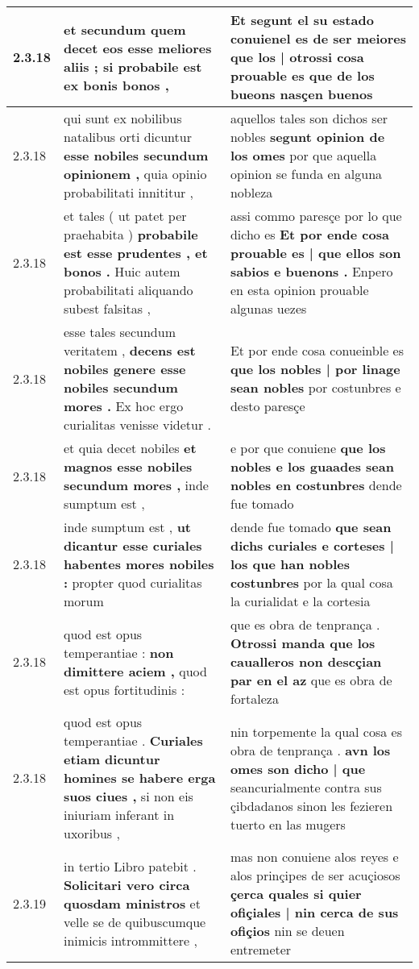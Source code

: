 \begin{tabular}{|p{1cm}|p{6.5cm}|p{6.5cm}|}
2.3.18 & et secundum quem decet \textbf{ eos esse meliores aliis ; } si probabile est ex bonis bonos , & Et segunt el su estado conuienel es de ser meiores \textbf{ que los | otrossi cosa prouable es } que de los bueons nasçen buenos \\\hline
2.3.18 & qui sunt ex nobilibus natalibus orti dicuntur \textbf{ esse nobiles secundum opinionem , } quia opinio probabilitati innititur , & aquellos tales son dichos ser nobles \textbf{ segunt opinion de los omes } por que aquella opinion se funda en alguna nobleza \\\hline
2.3.18 & et tales ( ut patet per praehabita ) \textbf{ probabile est esse prudentes , et bonos . } Huic autem probabilitati aliquando subest falsitas , & assi commo paresçe por lo que dicho es \textbf{ Et por ende cosa prouable es | que ellos son sabios e buenons . } Enpero en esta opinion prouable algunas uezes \\\hline
2.3.18 & esse tales secundum veritatem , \textbf{ decens est nobiles genere esse nobiles secundum mores . } Ex hoc ergo curialitas venisse videtur . & Et por ende cosa conueinble es \textbf{ que los nobles | por linage sean nobles } por costunbres e desto paresçe \\\hline
2.3.18 & et quia decet nobiles \textbf{ et magnos esse nobiles secundum mores , } inde sumptum est , & e por que conuiene \textbf{ que los nobles e los guaades sean nobles en costunbres } dende fue tomado \\\hline
2.3.18 & inde sumptum est , \textbf{ ut dicantur esse curiales habentes mores nobiles : } propter quod curialitas morum & dende fue tomado \textbf{ que sean dichs curiales e corteses | los que han nobles costunbres } por la qual cosa la curialidat e la cortesia \\\hline
2.3.18 & quod est opus temperantiae : \textbf{ non dimittere aciem , } quod est opus fortitudinis : & que es obra de tenprança . \textbf{ Otrossi manda que los caualleros non descçian par en el az } que es obra de fortaleza \\\hline
2.3.18 & quod est opus temperantiae . \textbf{ Curiales etiam dicuntur homines se habere erga suos ciues , } si non eis iniuriam inferant in uxoribus , & nin torpemente la qual cosa es obra de tenprança . \textbf{ avn los omes son dicho | que } seancurialmente contra sus çibdadanos sinon les fezieren tuerto en las mugers \\\hline
2.3.19 & in tertio Libro patebit . \textbf{ Solicitari vero circa quosdam ministros } et velle se de quibuscumque inimicis intrommittere , & mas non conuiene alos reyes e alos prinçipes de ser acuçiosos \textbf{ çerca quales si quier ofiçiales | nin cerca de sus ofiçios } nin se deuen entremeter \\\hline

\end{tabular}
